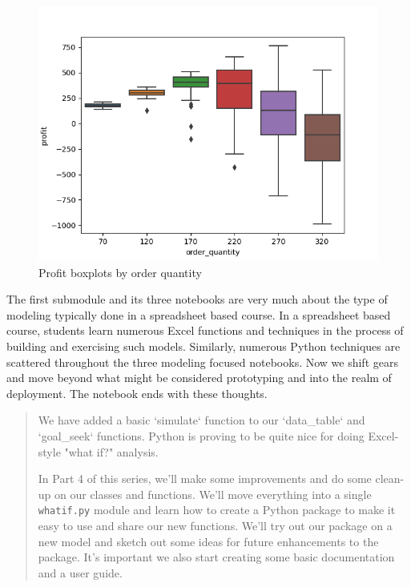 \documentclass[ited,blindrev]{informs3}              %
\newcommand{\code}[1]{\texttt{#1}}
\begin{document}
\begin{figure}[!ht]
	\centering
	\begin{minipage}{.80\textwidth}
		\includegraphics[width=1.0\textwidth]{images/boxplots.png}
	\end{minipage}
	\caption{Profit boxplots by order quantity}
	\label{fig:2way_dt}
\end{figure}

The first submodule and its three notebooks are very much about the type of modeling typically done in a spreadsheet based course. In a spreadsheet based course, students learn numerous Excel functions and techniques in the process of building and exercising such models. Similarly, numerous Python techniques are scattered throughout the three modeling focused notebooks. Now we shift gears and move beyond what might be considered prototyping and into the realm of deployment. The notebook ends with these thoughts.

\begin{tcolorbox}
	\begin{quotation}
		
\textsf{We have added a basic `simulate` function to our `data_table` and `goal_seek` functions. Python is proving to be quite nice for doing Excel-style "what if?" analysis.} 

\textsf{In Part 4 of this series, we'll make some improvements and do some clean-up on our classes and functions. We'll move everything into a single \code{whatif.py} module and learn how to create a Python package to make it easy to use and share our new functions. We'll try out our package on a new model and sketch out some ideas for future enhancements to the package. It's important we also start creating some basic documentation and a user guide.}
\end{quotation}
\end{tcolorbox}
\end{document}
